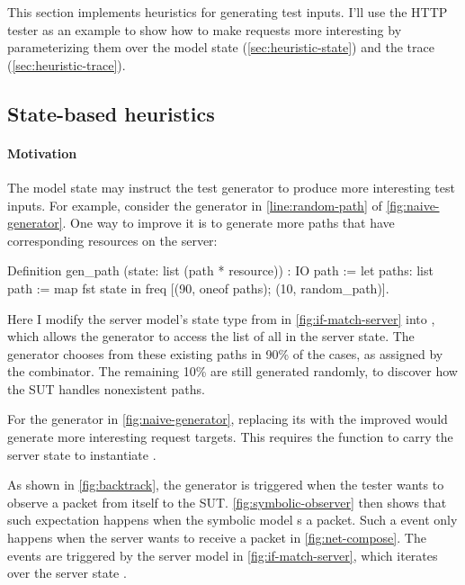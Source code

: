 This section implements heuristics for generating test inputs.  I'll use the
HTTP tester as an example to show how to make requests more interesting by
parameterizing them over the model state (\autoref{sec:heuristic-state}) and the
trace (\autoref{sec:heuristic-trace}).

\subsection{State-based heuristics}
\label{sec:heuristic-state}
\paragraph{Motivation}
The model state may instruct the test generator to produce more interesting test
inputs.  For example, consider the  generator in
\autoref{line:random-path} of \autoref{fig:naive-generator}.  One way to improve
it is to generate more paths that have corresponding resources on the server:
\begin{coq}
  Definition gen_path (state: list (path * resource)) : IO path :=
    let paths: list path := map fst state in
    freq [(90, oneof paths);
          (10, random_path)].
\end{coq}

Here I modify the server model's state type  from  in \autoref{fig:if-match-server} into , which allows the generator to access the list of all 
  in the server state.  The generator chooses from these existing paths in 90\%
  of the cases, as assigned by the  combinator.  The remaining 10\%
  are still generated randomly, to discover how the SUT handles nonexistent
  paths.

For the  generator in \autoref{fig:naive-generator}, replacing
its  with the improved  would generate more
interesting request targets.  This requires the  function to
carry the server state to instantiate .

As shown in \autoref{fig:backtrack}, the  generator is triggered
when the tester wants to observe a packet from itself to the SUT.
\autoref{fig:symbolic-observer} then shows that such  expectation
happens when the symbolic model s a packet.  Such a  event
only happens when the server wants to receive a packet in
\autoref{fig:net-compose}.  The  events are triggered by the server
model in \autoref{fig:if-match-server}, which iterates over the server state
.

